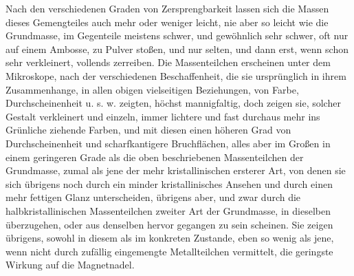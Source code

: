 \documentclass[a4paper, 11pt, oneside, german]{article}
\begin{document}
Nach den verschiedenen Graden von Zersprengbarkeit lassen sich die Massen dieses Gemengteiles auch mehr oder weniger leicht, nie aber so leicht wie die Grundmasse, im Gegenteile meistens schwer, und gewöhnlich sehr schwer, oft nur auf einem Ambosse, zu Pulver stoßen, und nur selten, und dann erst, wenn schon sehr verkleinert, vollends zerreiben. Die Massenteilchen erscheinen unter dem Mikroskope, nach der verschiedenen Beschaffenheit, die sie ursprünglich in ihrem Zusammenhange, in allen obigen vielseitigen Beziehungen, von Farbe, Durchscheinenheit u. s. w. zeigten, höchst mannigfaltig, doch zeigen sie, solcher Gestalt verkleinert und einzeln, immer lichtere und fast durchaus mehr ins Grünliche ziehende Farben, und mit diesen einen höheren Grad von Durchscheinenheit und scharfkantigere Bruchflächen, alles aber im Großen in einem geringeren Grade als die oben beschriebenen Massenteilchen der Grundmasse, zumal als jene der mehr kristallinischen ersterer Art, von denen sie sich übrigens noch durch ein minder kristallinisches Ansehen und durch einen mehr fettigen Glanz unterscheiden, übrigens aber, und zwar durch die halbkristallinischen Massenteilchen zweiter Art der Grundmasse, in dieselben überzugehen, oder aus denselben hervor gegangen zu sein scheinen. Sie zeigen übrigens, sowohl in diesem als im konkreten Zustande, eben so wenig als jene, wenn nicht durch zufällig eingemengte Metallteilchen vermittelt, die geringste Wirkung auf die Magnetnadel.
\end{document}
